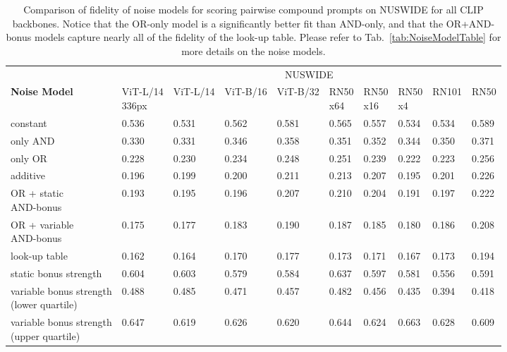\begin{table*}[ht]
\centering
\begin{tabular}{l|lllllllll}
\toprule
{} & \multicolumn{9}{c}{NUSWIDE} \\
\textbf{Noise Model} & \makecell{ViT-L/14 \\ 336px} & ViT-L/14 & ViT-B/16 & ViT-B/32 & \makecell{RN50 \\ x64} & \makecell{RN50 \\ x16} & \makecell{RN50 \\ x4} &  RN101 &   RN50 \\
\midrule
constant                   &        0.536 &   0.531 &   0.562 &   0.581 &   0.565 &   0.557 &  0.534 &  0.534 &  0.589 \\
\hline
only AND                     &        0.330 &   0.331 &   0.346 &   0.358 &   0.351 &   0.352 &  0.344 &  0.350 &  0.371 \\
\hline
only OR                      &        0.228 &   0.230 &   0.234 &   0.248 &   0.251 &   0.239 &  0.222 &  0.223 &  0.256 \\
\hline
additive                     &        0.196 &   0.199 &   0.200 &   0.211 &   0.213 &   0.207 &  0.195 &  0.201 &  0.226 \\
\hline
\makecell{OR + static \\ AND-bonus}            &        0.193 &   0.195 &   0.196 &   0.207 &   0.210 &   0.204 &  0.191 &  0.197 &  0.222 \\
\hline
\makecell{OR + variable \\ AND-bonus} &        0.175 &   0.177 &   0.183 &   0.190 &   0.187 &   0.185 &  0.180 &  0.186 &  0.208 \\
\hline
look-up table                 &        0.162 &   0.164 &   0.170 &   0.177 &   0.173 &   0.171 &  0.167 &  0.173 &  0.194 \\
\hline\hline
static bonus strength                        &        0.604 &   0.603 &   0.579 &   0.584 &   0.637 &   0.597 &  0.581 &  0.556 &  0.591 \\
\hline
\makecell{variable bonus strength \\ (lower quartile)}    &        0.488 &   0.485 &   0.471 &   0.457 &   0.482 &   0.456 &  0.435 &  0.394 &  0.418 \\
\hline
\makecell{variable bonus strength \\ (upper quartile)}    &        0.647 &   0.619 &   0.626 &   0.620 &   0.644 &   0.624 &  0.663 &  0.628 &  0.609 \\
\bottomrule
\end{tabular}
\caption{Comparison of fidelity of noise models for scoring pairwise compound prompts on NUSWIDE for all CLIP backbones. Notice that the OR-only model is a significantly better fit than AND-only, and that the OR+AND-bonus models capture nearly all of the fidelity of the look-up table. Please refer to Tab.~\ref{tab:NoiseModelTable} for more details on the noise models.}
\label{tab:NoiseModelExtendedNUSWIDE}
\end{table*}
